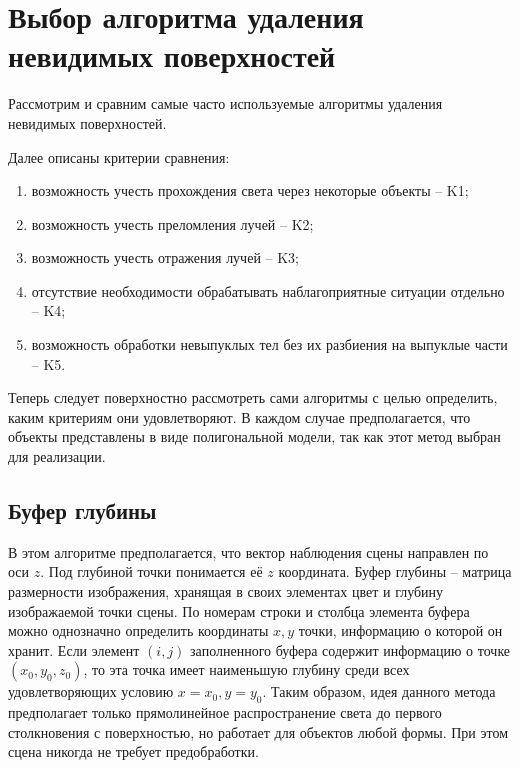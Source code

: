 \section{Выбор алгоритма удаления невидимых поверхностей} {
    Рассмотрим и сравним самые часто используемые алгоритмы удаления
    невидимых поверхностей.

    Далее описаны критерии сравнения:
    \begin{enumerate}
        \item возможность учесть прохождения света через некоторые объекты -- K1;
        \item возможность учесть преломления лучей -- K2;
        \item возможность учесть отражения лучей -- K3;
        \item отсутствие необходимости обрабатывать наблагоприятные
        ситуации отдельно -- K4;
        \item возможность обработки невыпуклых тел без их разбиения
        на выпуклые части -- K5.
    \end{enumerate}

    Теперь следует поверхностно рассмотреть сами алгоритмы с целью определить,
    каким критериям они удовлетворяют.
    В каждом случае предполагается, что объекты представлены в виде полигональной
    модели, так как этот метод выбран для реализации.

    \subsection{Буфер глубины} {
        В этом алгоритме предполагается, что вектор наблюдения сцены
        направлен по оси $z$.
        Под глубиной точки понимается её $z$ координата.
        Буфер глубины -- матрица размерности изображения, хранящая
        в своих элементах цвет и глубину изображаемой точки сцены.
        По номерам строки и столбца элемента буфера можно однозначно определить
        координаты $x, y$ точки, информацию о которой он хранит.
        Если элемент $(i, j)$ заполненного буфера содержит информацию
        о точке $(x_0, y_0, z_0)$, то эта точка имеет наименьшую глубину
        среди всех удовлетворяющих условию $x = x_0, y = y_0$.
        Таким образом, идея данного метода предполагает только прямолинейное
        распространение света до первого столкновения с поверхностью,
        но работает для объектов любой формы.
        При этом сцена никогда не требует предобработки.
    }

}
